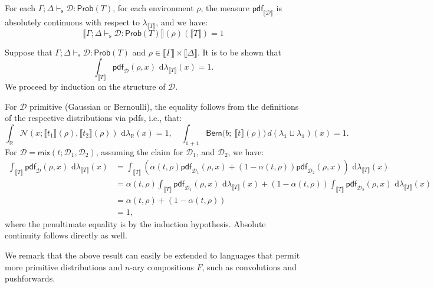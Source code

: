 \documentclass[preprint]{uai2026} %
\newcommand{\unittype}{\mathbb{1}}
\newcommand{\RR}{\mathbb{R}}
\newcommand{\sem}[1]{\llbracket #1 \rrbracket}
\newcommand{\safevdash}{\vdash_{\text{s}}}
\newcommand{\mix}[3]{\mathsf{mix}(#1;#2,#3)}
\newcommand{\Prob}{\mathsf{Prob}}
\newcommand{\pdf}{\mathsf{pdf}}
\newcommand{\dd}{\,\mathrm{d}}
\begin{document}
\begin{propositionE}\label{prop:dist-sem-is-prob}
    For each $\Gamma; \Delta \safevdash \mathcal{D}: \Prob(T)$, for each environment $\rho$, the measure $\pdf_{\sem{\mathcal D}}$ is absolutely continuous with respect to $\lambda_{\sem{T}}$, and we have: \[
\sem{\Gamma;\Delta \safevdash \mathcal{D}:\Prob(T)}(\rho)(\sem{T}) = 1
\]
\end{propositionE}
\begin{proofE}
    Suppose that $\Gamma; \Delta \safevdash \mathcal{D}: \Prob(T)$ and $\rho\in\sem{\Gamma}\times\sem{\Delta}$. It is to be shown that 
    \[
        \int_{\sem{T}}\pdf_{\mathcal{D}}(\rho,x)\,\dd\lambda_{\sem{T}}(x)=1.
    \]
    We proceed by induction on the structure of $\mathcal{D}$. 
    
    For $\mathcal{D}$ primitive (Gaussian or Bernoulli), the equality follows from the definitions of the respective distributions via pdfs, i.e., that:
    \[\int_{\RR}\mathcal{N}\left(x;\sem{t_1}(\rho),\sem{t_2}(\rho)\right)\,\dd\lambda_{\RR}(x)=1,\quad \int_{\unittype+\unittype}\mathsf{Bern}\big(b;\ \sem{t}(\rho)\big)\,d(\lambda_\unittype\sqcup\lambda_\unittype)(x)=1.\]
    For $\mathcal{D}=\mix{t}{\mathcal{D}_1}{\mathcal{D}_2}$, assuming the claim for $\mathcal{D}_1$, and $\mathcal{D}_2$, we have:
    \begin{align*}
        \int_{\sem{T}}\pdf_{\mathcal{D}}(\rho,x)\,\dd\lambda_{\sem{T}}(x)
        &=
        \int_{\sem{T}}\left(\alpha(t, \rho)\pdf_{\mathcal{D}_1}(\rho,x)
        + (1 - \alpha(t, \rho))\pdf_{\mathcal{D}_2}(\rho,x) \right)\,\dd\lambda_{\sem{T}}(x)\\
        &=\alpha(t, \rho)\int_{\sem{T}}\pdf_{\mathcal{D}_1}(\rho,x)\,\dd\lambda_{\sem{T}}(x)
        + (1 - \alpha(t, \rho))\int_{\sem{T}}\pdf_{\mathcal{D}_2}(\rho,x) \,\dd\lambda_{\sem{T}}(x)\\
        &=\alpha(t, \rho)+ (1 - \alpha(t, \rho))\\&=1
        ,
    \end{align*}
    where the penultimate equality is by the induction hypothesis. Absolute continuity follows directly as well.
\end{proofE}
We remark that the above result can easily be extended to languages that permit more primitive distributions and $n$-ary compositions $F$, such as convolutions and pushforwards.
\end{document}

